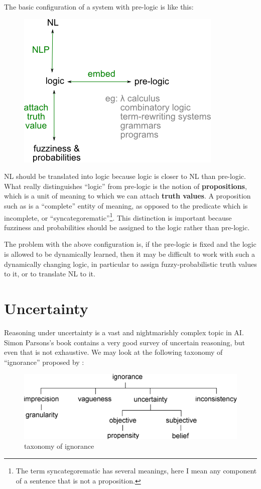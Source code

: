 The basic configuration of a system with pre-logic is like this:
\begin{figure}[H]
\centering
\includegraphics[scale=0.7]{prelogic.png}
\end{figure}
NL should be translated into logic because logic is closer to NL than pre-logic.  What really distinguishes ``logic'' from pre-logic is the notion of \textbf{propositions}, which is a unit of meaning to which we can attach \textbf{truth values}.  A proposition such as  is a ``complete'' entity of meaning, as opposed to the predicate  which is incomplete, or ``syncategorematic''\footnote{The term syncategorematic has several meanings, here I mean any component of a sentence that is not a proposition.}.  This distinction is important because fuzziness and probabilities should be assigned to the logic rather than pre-logic.

The problem with the above configuration is, if the pre-logic is fixed and the logic is allowed to be dynamically learned, then it may be difficult to work with such a dynamically changing logic, in particular to assign fuzzy-probabilistic truth values to it, or to translate NL to it.

\section{Uncertainty}

Reasoning under uncertainty is a vast and nightmarishly complex topic in AI.  Simon Parsons's book \citep*{Parsons2001} contains a very good survey of uncertain reasoning, but even that is not exhaustive.  We may look at the following taxonomy of ``ignorance'' proposed by \citep*{Bosc1997}:
\begin{figure}[H]
\centering
\includegraphics[scale=0.7]{IgnoranceTaxonomy.png}
\caption{taxonomy of ignorance}
\end{figure}

